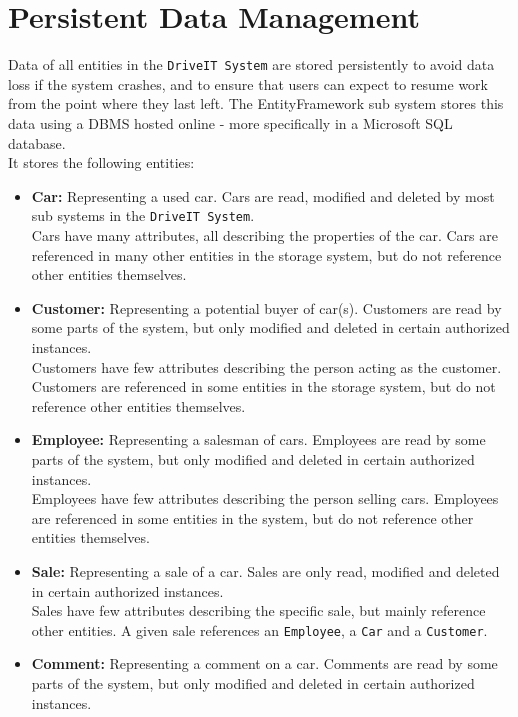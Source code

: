 \section{Persistent Data Management}
Data of all entities in the \texttt{DriveIT System} are stored persistently to avoid data loss if the system crashes, and to ensure that users can expect to resume work from the point where they last left.
The EntityFramework sub system stores this data using a DBMS hosted online - more specifically in a Microsoft SQL database.\\

It stores the following entities:
\begin{itemize}
	\item \textbf{Car:} Representing a used car. Cars are read, modified and deleted by most sub systems in the \texttt{DriveIT System}.\\
	Cars have many attributes, all describing the properties of the car. Cars are referenced in many other entities in the storage system, but do not reference other entities themselves.
	\item \textbf{Customer:} Representing a potential buyer of car(s). Customers are read by some parts of the system, but only modified and deleted in certain authorized instances.\\
	Customers have few attributes describing the person acting as the customer. Customers are referenced in some entities in the storage system, but do not reference other entities themselves.
	\item \textbf{Employee:} Representing a salesman of cars. Employees are read by some parts of the system, but only modified and deleted in certain authorized instances. \\
	Employees have few attributes describing the person selling cars. Employees are referenced in some entities in the system, but do not reference other entities themselves.
	\item \textbf{Sale:} Representing a sale of a car. Sales are only read, modified and deleted in certain authorized instances. \\
	Sales have few attributes describing the specific sale, but mainly reference other entities. A given sale references an \texttt{Employee}, a \texttt{Car} and a \texttt{Customer}.
	\item \textbf{Comment:} Representing a comment on a car. Comments are read by some parts of the system, but only modified and deleted in certain authorized instances. \\

\end{itemize}
